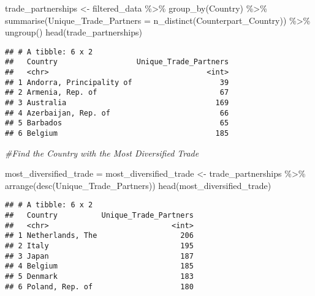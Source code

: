 \documentclass[
]{article}
\newenvironment{Shaded}{\begin{snugshade}}{\end{snugshade}}
\newcommand{\AttributeTok}[1]{\textcolor[rgb]{0.77,0.63,0.00}{#1}}
\newcommand{\CommentTok}[1]{\textcolor[rgb]{0.56,0.35,0.01}{\textit{#1}}}
\newcommand{\FunctionTok}[1]{\textcolor[rgb]{0.00,0.00,0.00}{#1}}
\newcommand{\NormalTok}[1]{#1}
\newcommand{\OtherTok}[1]{\textcolor[rgb]{0.56,0.35,0.01}{#1}}
\newcommand{\SpecialCharTok}[1]{\textcolor[rgb]{0.00,0.00,0.00}{#1}}
\begin{document}
\begin{Shaded}
\begin{Highlighting}[]
\NormalTok{trade\_partnerships }\OtherTok{\textless{}{-}}\NormalTok{ filtered\_data }\SpecialCharTok{\%\textgreater{}\%}
  \FunctionTok{group\_by}\NormalTok{(Country) }\SpecialCharTok{\%\textgreater{}\%}
  \FunctionTok{summarise}\NormalTok{(}\AttributeTok{Unique\_Trade\_Partners =} \FunctionTok{n\_distinct}\NormalTok{(Counterpart\_Country)) }\SpecialCharTok{\%\textgreater{}\%}
  \FunctionTok{ungroup}\NormalTok{()}
\FunctionTok{head}\NormalTok{(trade\_partnerships)}
\end{Highlighting}
\end{Shaded}

\begin{verbatim}
## # A tibble: 6 x 2
##   Country                  Unique_Trade_Partners
##   <chr>                                    <int>
## 1 Andorra, Principality of                    39
## 2 Armenia, Rep. of                            67
## 3 Australia                                  169
## 4 Azerbaijan, Rep. of                         66
## 5 Barbados                                    65
## 6 Belgium                                    185
\end{verbatim}

\begin{Shaded}
\begin{Highlighting}[]
\CommentTok{\#Find the Country with the Most Diversified Trade}

\NormalTok{most\_diversified\_trade }\OtherTok{=}\NormalTok{ most\_diversified\_trade }\OtherTok{\textless{}{-}}\NormalTok{ trade\_partnerships }\SpecialCharTok{\%\textgreater{}\%}
  \FunctionTok{arrange}\NormalTok{(}\FunctionTok{desc}\NormalTok{(Unique\_Trade\_Partners))}
\FunctionTok{head}\NormalTok{(most\_diversified\_trade)}
\end{Highlighting}
\end{Shaded}

\begin{verbatim}
## # A tibble: 6 x 2
##   Country          Unique_Trade_Partners
##   <chr>                            <int>
## 1 Netherlands, The                   206
## 2 Italy                              195
## 3 Japan                              187
## 4 Belgium                            185
## 5 Denmark                            183
## 6 Poland, Rep. of                    180
\end{verbatim}
\end{document}
